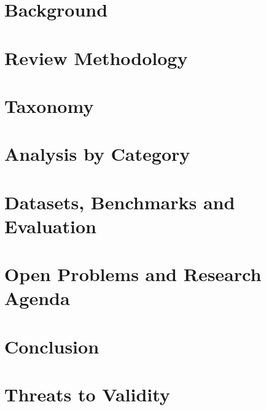\documentclass[manuscript,screen]{acmart}
\begin{document}
\section{Background}\label{sec:background}


\section{Review Methodology}\label{sec:methodology}


\section{Taxonomy}\label{sec:taxonomy}


\section{Analysis by Category}\label{sec:analysis}


\section{Datasets, Benchmarks and Evaluation}\label{sec:datasets}


\section{Open Problems and Research Agenda}\label{sec:open-problems}


\section{Conclusion}\label{sec:conclusion}


\section{Threats to Validity}\label{sec:threats}





\appendix
\end{document}
